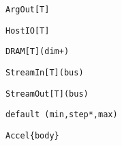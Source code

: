 \begin{table*}
\newsavebox{\argOutSyntax}
\begin{lrbox}{\argOutSyntax}
\begin{lstlisting}[language=SpatialTable]
ArgOut[T]
\end{lstlisting}
\end{lrbox}

\newsavebox{\hostIOSyntax}
\begin{lrbox}{\hostIOSyntax}
\begin{lstlisting}[language=SpatialTable]
HostIO[T]
\end{lstlisting}
\end{lrbox}

\newsavebox{\dramSyntax}
\begin{lrbox}{\dramSyntax}
\begin{lstlisting}[language=SpatialTable]
DRAM[T](dim+)
\end{lstlisting}
\end{lrbox}

\newsavebox{\streamInSyntax}
\begin{lrbox}{\streamInSyntax}
\begin{lstlisting}[language=SpatialTable]
StreamIn[T](bus)
\end{lstlisting}
\end{lrbox}

\newsavebox{\streamOutSyntax}
\begin{lrbox}{\streamOutSyntax}
\begin{lstlisting}[language=SpatialTable]
StreamOut[T](bus)
\end{lstlisting}
\end{lrbox}

\newsavebox{\parameterSyntax}
\begin{lrbox}{\parameterSyntax}
\begin{lstlisting}[language=SpatialTable]
default (min,step*,max)
\end{lstlisting}
\end{lrbox}

\newsavebox{\accelSyntax}
\begin{lrbox}{\accelSyntax}
\begin{lstlisting}[language=SpatialTable]
Accel{body}
\end{lstlisting}
\end{lrbox}


\end{table*}
